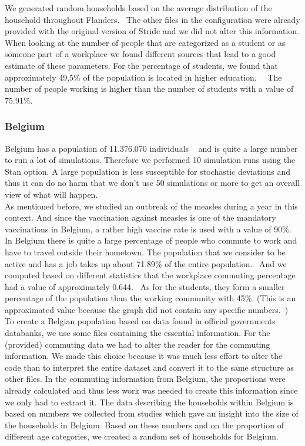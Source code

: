 \documentclass[runningheads]{llncs}
\begin{document}
	We generated random households based on the average distribution of the household throughout Flanders.~\cite{5} The other files in the configuration were already provided with the original version of Stride and we did not alter this information. When looking at the number of people that are categorized as a student or as someone part of a workplace we found different sources that lead to a good estimate of these parameters. For the percentage of students, we found that approximately 49,5\% of the population is located in higher education.~\cite{6}~\cite{17} The number of people working is higher than the number of students with a value of 75.91\%.~\cite{7}
	\newpage
	\subsubsection{Belgium}
	
	Belgium has a population of 11.376.070 individuals ~\cite{8} and is quite a large number to run a lot of simulations. Therefore we performed 10 simulation runs using the Stan option. A large population is less susceptible for stochastic deviations and thus it can do no harm that we don't use 50 simulations or more to get an overall view of what will happen.\\
	
	As mentioned before, we studied an outbreak of the measles during a year in this context. And since the vaccination against measles is one of the mandatory vaccinations in Belgium, a rather high vaccine rate is used with a value of 90\%. ~\cite{9} In Belgium there is quite a large percentage of people who commute to work and have to travel outside their hometown. The population that we consider to be active and has a job takes up about 71.89\% of the entire population.~\cite{14} And we computed based on different statistics that the workplace commuting percentage had a value of approximately 0.644.~\cite{12} As for the students, they form a smaller percentage of the population than the working community with 45\%. (This is an approximated value because the graph did not contain any specific numbers.~\cite{15})\\
	
	To create a Belgian population based on data found in official governments databanks, we use some files containing the essential information. For the (provided) commuting data we had to alter the reader for the commuting information. We made this choice because it was much less effort to alter the code than to interpret the entire dataset and convert it to the same structure as other files. In the commuting information from Belgium, the proportions were already calculated and thus less work was needed to create this information since we only had to extract it. The data describing the households within Belgium is based on numbers we collected from studies which gave an insight into the size of the households in Belgium. Based on these numbers and on the proportion of different age categories, we created a random set of households for Belgium.~\cite{10} ~\cite{11}
	
\end{document}
